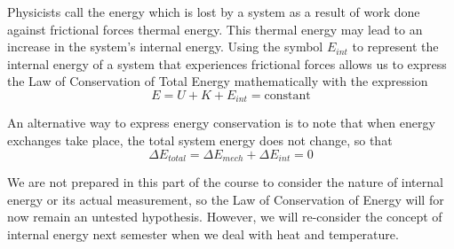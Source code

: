 Physicists call the energy which is lost by a system as a result of work done
against frictional forces thermal energy. This thermal energy may lead to an
increase in the system's internal energy. Using the symbol \(  E_{int} \) to
represent the internal energy of a system that experiences frictional
forces allows us to express the Law of Conservation of Total Energy 
mathematically with the expression
\[
E=U+K+ E_{int}=\mbox{constant}\]


An alternative way to express energy conservation is to note that when energy
exchanges take place, the total system energy does not change, so that
\[
\Delta E_{total}=\Delta E_{mech}+\Delta E_{int} = 0\]


We are not prepared in this part of the course to consider the nature of internal energy or its actual measurement, so the Law of Conservation of Energy will
for now remain an untested hypothesis. However, we will re-consider the concept
of internal energy next semester when we deal with heat and temperature.

